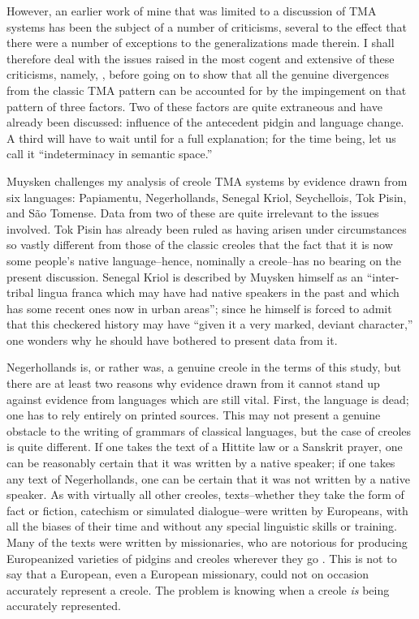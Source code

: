However, an earlier work of mine \citep{Bickerton1974} that was limited to a discussion of TMA systems has been the subject of a number of criticisms, several to the effect that there were a number of exceptions to the generalizations made therein. I shall therefore deal with the issues raised in the most cogent and extensive of these criti\-cisms, namely, \citet{Muysken1981a}, before going on to show that all the genuine divergences from the classic TMA pattern can be accounted for by the impingement on that pattern of three factors. Two of these factors are quite extraneous and have already been discussed: influence of the antecedent pidgin and language change. A third will have to wait until  for a full explanation; for the time being, let us call it ``indeterminacy in semantic space.''

Muysken challenges my analysis of creole TMA systems by evidence drawn from six languages: Papiamentu, Negerhollands, Senegal Kriol, Seychellois, Tok Pisin, and S{\~a}o Tomense. Data from two of these are quite irrelevant to the issues involved. Tok Pisin has already been ruled as having arisen under circumstances so vastly different from those of the classic creoles that the fact that it is now some people's%
native language--hence, nominally a creole--has no bearing on the present discussion. Senegal Kriol is described by Muysken himself as an ``inter-tribal lingua franca which may have had native speakers in the past and which has some recent ones now in urban areas''; since he himself is forced to admit that this checkered history may have ``given it a very marked, deviant character,'' one wonders why he should have bothered to present data from it.

Negerhollands is, or rather was, a genuine creole in the terms of this study, but there are at least two reasons why evidence drawn from it cannot stand up against evidence from languages which are still vital. First, the language is dead; one has to rely entirely on printed sources. This may not present a genuine obstacle to the writing of grammars of classical languages, but the case of creoles is quite different. If one takes the text of a Hittite law or a Sanskrit prayer, one can be reasonably certain that it was written by a native speaker; if one takes any text of Negerhollands, one can be certain that it was not written by a native speaker. As with virtually all other creoles, texts--whether they take the form of fact or fiction, catechism or simulated dialogue--were written by Europeans, with all the biases of their time and without any special linguistic skills or training. Many of the texts were written by missionaries, who are notorious for producing Europeanized varieties of pidgins and creoles wherever they go \citep{Voorhoeve1971}. This is not to say that a European, even a European missionary, could not on occasion accurately represent a creole. The problem is knowing when a creole \textit{is} being accurately represented.

